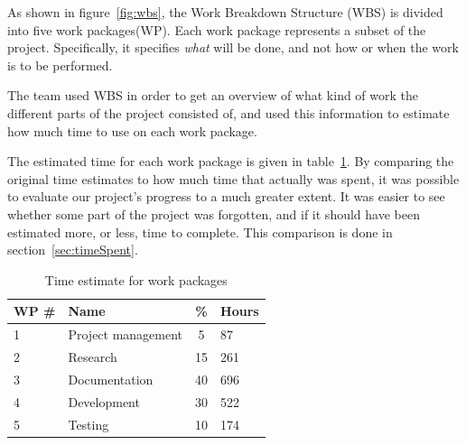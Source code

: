 As shown in figure~\ref{fig:wbs}, the Work Breakdown Structure (WBS) is divided into five work packages(WP). Each work package represents a subset of the project. Specifically, it specifies \emph{what} will be done, and not how or when the work is to be performed.

The team used WBS in order to get an overview of what kind of work the different parts of the project consisted of, and used this information to estimate how much time to use on each work package.

The estimated time for each work package is given in table~\ref{tab:timeEstWP}. By comparing the original time estimates to how much time that actually was spent, it was possible to evaluate our project's progress to a much greater extent. It was easier to see whether some part of the project was forgotten, and if it should have been estimated more, or less, time to complete. This comparison is done in section~\ref{sec:timeSpent}.

\begin{table}[H]
\centering
{}
\begin{tabular}{|l|l|c|l|}
\hline
    \textbf{WP \#} & \textbf{Name} & \textbf{\%} & \textbf{Hours} \\\hline
    1 & Project management & 5 & 87\\\hline
    2 & Research		   & 15 & 261\\\hline
    3 & Documentation	   & 40 & 696\\\hline
    4 & Development 	   & 30 & 522\\\hline
    5 & Testing  		   & 10 & 174\\\hline
\end{tabular}
\caption{Time estimate for work packages}
\label{tab:timeEstWP}
\end{table}
